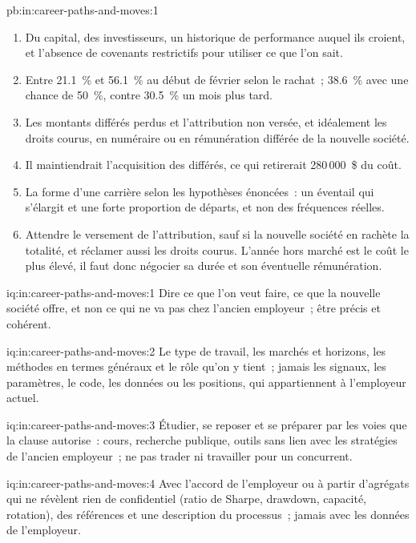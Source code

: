 \begin{solution}{pb:in:career-paths-and-moves:1}
\begin{enumerate}
\item Du capital, des investisseurs, un historique de performance auquel ils croient, et l'absence de covenants restrictifs pour utiliser ce que l'on sait.
\item Entre 21.1~\% et 56.1~\% au début de février selon le rachat~; 38.6~\% avec une chance de 50~\%, contre 30.5~\%
un mois plus tard.
\item Les montants différés perdus et l'attribution non versée, et idéalement les droits courus, en numéraire ou en rémunération différée de la nouvelle société.
\item Il maintiendrait l'acquisition des différés, ce qui retirerait 280\,000~\$ du coût.
\item La forme d'une carrière selon les hypothèses énoncées~: un éventail qui s'élargit et une forte proportion de départs, et non des fréquences réelles.
\item Attendre le versement de l'attribution, sauf si la nouvelle société en rachète la totalité, et réclamer aussi les droits courus. L'année hors
marché est le coût le plus élevé, il faut donc négocier sa durée et son éventuelle rémunération.
\end{enumerate}
\end{solution}

\begin{solution}{iq:in:career-paths-and-moves:1}
Dire ce que l'on veut faire, ce que la nouvelle société offre, et non ce qui ne va pas chez l'ancien employeur~; être précis et cohérent.
\end{solution}

\begin{solution}{iq:in:career-paths-and-moves:2}
Le type de travail, les marchés et horizons, les méthodes en termes généraux et le rôle qu'on y tient~; jamais les signaux, les paramètres,
le code, les données ou les positions, qui appartiennent à l'employeur actuel.
\end{solution}

\begin{solution}{iq:in:career-paths-and-moves:3}
Étudier, se reposer et se préparer par les voies que la clause autorise~: cours, recherche publique, outils sans lien avec les
stratégies de l'ancien employeur~; ne pas trader ni travailler pour un concurrent.
\end{solution}

\begin{solution}{iq:in:career-paths-and-moves:4}
Avec l'accord de l'employeur ou à partir d'agrégats qui ne révèlent rien de confidentiel (ratio de Sharpe, drawdown, capacité,
rotation), des références et une description du processus~; jamais avec les données de l'employeur.
\end{solution}

